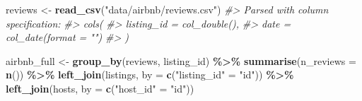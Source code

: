 \documentclass[
]{book}
\newenvironment{Shaded}{\begin{snugshade}}{\end{snugshade}}
\newcommand{\CommentTok}[1]{\textcolor[rgb]{0.56,0.35,0.01}{\textit{#1}}}
\newcommand{\DataTypeTok}[1]{\textcolor[rgb]{0.13,0.29,0.53}{#1}}
\newcommand{\KeywordTok}[1]{\textcolor[rgb]{0.13,0.29,0.53}{\textbf{#1}}}
\newcommand{\NormalTok}[1]{#1}
\newcommand{\OperatorTok}[1]{\textcolor[rgb]{0.81,0.36,0.00}{\textbf{#1}}}
\newcommand{\StringTok}[1]{\textcolor[rgb]{0.31,0.60,0.02}{#1}}
\begin{document}
\begin{Shaded}
\begin{Highlighting}[]
\NormalTok{reviews \textless{}{-}}\StringTok{ }\KeywordTok{read\_csv}\NormalTok{(}\StringTok{"data/airbnb/reviews.csv"}\NormalTok{)}
\CommentTok{\#\textgreater{} Parsed with column specification:}
\CommentTok{\#\textgreater{} cols(}
\CommentTok{\#\textgreater{}   listing\_id = col\_double(),}
\CommentTok{\#\textgreater{}   date = col\_date(format = "")}
\CommentTok{\#\textgreater{} )}

\NormalTok{airbnb\_full \textless{}{-}}\StringTok{ }\KeywordTok{group\_by}\NormalTok{(reviews, listing\_id) }\OperatorTok{\%\textgreater{}\%}\StringTok{ }
\StringTok{  }\KeywordTok{summarise}\NormalTok{(}\DataTypeTok{n\_reviews =} \KeywordTok{n}\NormalTok{()) }\OperatorTok{\%\textgreater{}\%}\StringTok{ }
\StringTok{  }\KeywordTok{left\_join}\NormalTok{(listings, }\DataTypeTok{by =} \KeywordTok{c}\NormalTok{(}\StringTok{"listing\_id"}\NormalTok{ =}\StringTok{ "id"}\NormalTok{)) }\OperatorTok{\%\textgreater{}\%}\StringTok{ }
\StringTok{  }\KeywordTok{left\_join}\NormalTok{(hosts, }\DataTypeTok{by =} \KeywordTok{c}\NormalTok{(}\StringTok{"host\_id"}\NormalTok{ =}\StringTok{ "id"}\NormalTok{))}


\end{Highlighting}
\end{Shaded}
\end{document}
